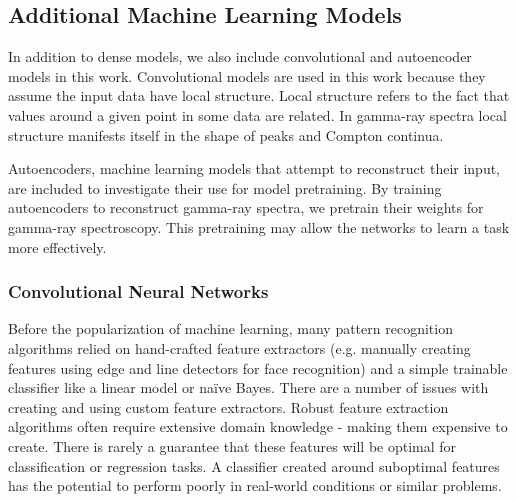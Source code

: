 



\subsection{Additional Machine Learning Models}

In addition to dense models, we also include convolutional and autoencoder models in this work. Convolutional models are used in this work because they assume the input data have local structure. Local structure refers to the fact that values around a given point in some data are related. In gamma-ray spectra local structure manifests itself in the shape of peaks and Compton continua.

Autoencoders, machine learning models that attempt to reconstruct their input, are included to investigate their use for model pretraining. By training autoencoders to reconstruct gamma-ray spectra, we pretrain their weights for gamma-ray spectroscopy. This pretraining may allow the networks to learn a task more effectively.

\subsubsection{Convolutional Neural Networks}

Before the popularization of machine learning, many pattern recognition algorithms relied on hand-crafted feature extractors (e.g. manually creating features using edge and line detectors for face recognition) and a simple trainable classifier like a linear model or na{\"i}ve Bayes. There are a number of issues with creating and using custom feature extractors. Robust feature extraction algorithms often require extensive domain knowledge - making them expensive to create. There is rarely a guarantee that these features will be optimal for classification or regression tasks. A classifier created around suboptimal features has the potential to perform poorly in real-world conditions or similar problems.

